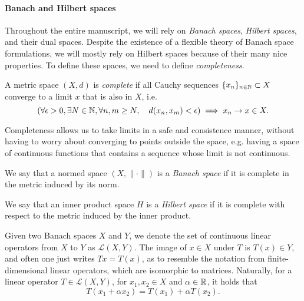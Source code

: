 \paragraph{Banach and Hilbert spaces}\label{sec:banach-hilbert-spaces}
Throughout the entire manuscript, we will rely on \emph{Banach spaces}, \emph{Hilbert spaces}, and their dual spaces. Despite the existence of a flexible theory of Banach space formulations, we will mostly rely on Hilbert spaces because of their many nice properties. To define these spaces, we need to define \emph{completeness}.
\begin{definition}[Completeness]
    A metric space $(X,d)$ is \emph{complete} if all Cauchy sequences $\{x_n\}_{n\in\mathbb{N}}\subset X$ converge to a limit $x$ that is also in $X$, i.e.
    \begin{equation}
        \left(\forall \epsilon > 0, \exists N\in\mathbb{N}, \forall n,m\geq N,\quad  d(x_n, x_m) < \epsilon\right) \implies x_n \to x\in X.
    \end{equation}
\end{definition}
Completeness allows us to take limits in a safe and consistence manner, without having to worry about converging to points outside the space, e.g. having a space of continuous functions that contains a sequence whose limit is not continuous. 
\begin{definition}\label{def:banach-space}
    We say that a normed space $(X,\|\cdot\|)$ is a \emph{Banach space} if it is complete in the metric induced by its norm.
\end{definition}
\begin{definition}\label{def:hilbert-space}
    We say that an inner product space $H$ is a \emph{Hilbert space} if it is complete with respect to the metric induced by the inner product.
\end{definition}
\begin{definition}\label{def:linear-operator}
    Given two Banach spaces $X$ and $Y$, we denote the set of continuous linear operators from $X$ to $Y$ as $\mathcal{L}(X,Y)$. The image of $x\in X$ under $T$ is $T(x)\in Y$, and often one just writes $Tx = T(x)$, as to resemble the notation from finite-dimensional linear operators, which are isomorphic to matrices. Naturally, for a linear operator $T\in \mathcal{L}(X,Y)$, for $x_1,x_2\in X$ and $\alpha\in\mathbb{R}$, it holds that 
    \begin{equation}
        T(x_1+\alpha x_2) = T(x_1) + \alpha T(x_2).
    \end{equation}
\end{definition}

